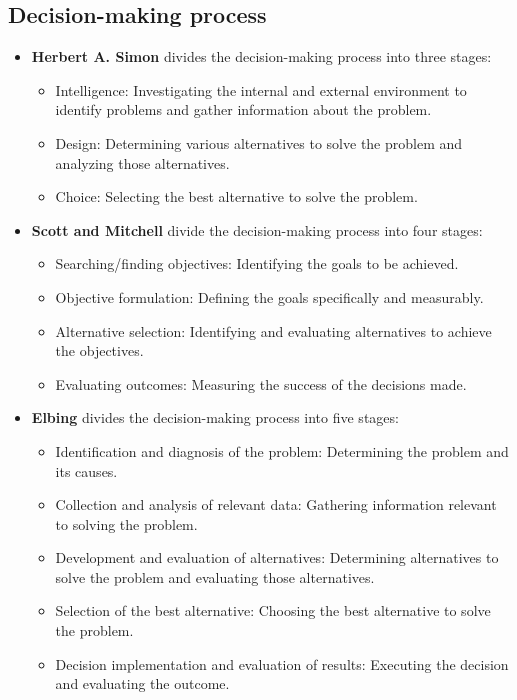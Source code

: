 \documentclass[12pt,titlepage]{article}
\begin{document}
\subsection{Decision-making process}
\begin{itemize}
    \item \textbf{Herbert A. Simon} divides the decision-making process into three stages:
    \begin{itemize}
        \item Intelligence: Investigating the internal and external environment to identify problems and gather information about the problem.
        \item Design: Determining various alternatives to solve the problem and analyzing those alternatives.
        \item Choice: Selecting the best alternative to solve the problem.
    \end{itemize}
    \item \textbf{Scott and Mitchell} divide the decision-making process into four stages:
    \begin{itemize}
        \item Searching/finding objectives: Identifying the goals to be achieved.
        \item Objective formulation: Defining the goals specifically and measurably.
        \item Alternative selection: Identifying and evaluating alternatives to achieve the objectives.
        \item Evaluating outcomes: Measuring the success of the decisions made.
    \end{itemize}
    \item \textbf{Elbing} divides the decision-making process into five stages:
    \begin{itemize}
        \item Identification and diagnosis of the problem: Determining the problem and its causes.
        \item Collection and analysis of relevant data: Gathering information relevant to solving the problem.
        \item Development and evaluation of alternatives: Determining alternatives to solve the problem and evaluating those alternatives.
        \item Selection of the best alternative: Choosing the best alternative to solve the problem.
        \item Decision implementation and evaluation of results: Executing the decision and evaluating the outcome.

\end{itemize}
\end{itemize}
\end{document}
